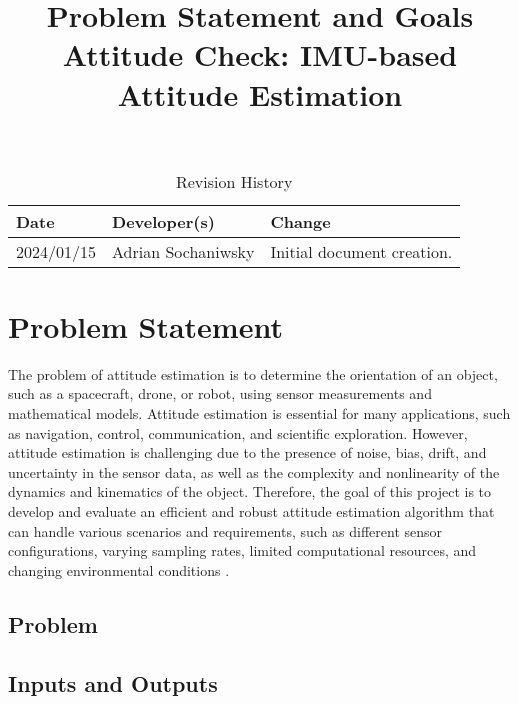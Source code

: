 \documentclass{article}
\title{Problem Statement and Goals \\ Attitude Check: IMU-based Attitude Estimation}
\author{\authname}
\date{}
\begin{document}
\maketitle

\begin{table}[hp]
\caption{Revision History} \label{TblRevisionHistory}
\begin{tabularx}{\textwidth}{llX}
\toprule
\textbf{Date} & \textbf{Developer(s)} & \textbf{Change}\\
\midrule
2024/01/15 & Adrian Sochaniwsky & Initial document creation.\\
\bottomrule
\end{tabularx}
\end{table}

\section{Problem Statement}


The problem of attitude estimation is to determine the orientation of an object, such as a spacecraft, drone, or robot, using sensor measurements and mathematical models. Attitude estimation is essential for many applications, such as navigation, control, communication, and scientific exploration. However, attitude estimation is challenging due to the presence of noise, bias, drift, and uncertainty in the sensor data, as well as the complexity and nonlinearity of the dynamics and kinematics of the object. Therefore, the goal of this project is to develop and evaluate an efficient and robust attitude estimation algorithm that can handle various scenarios and requirements, such as different sensor configurations, varying sampling rates, limited computational resources, and changing environmental conditions \cite{statement}.

\subsection{Problem}

\subsection{Inputs and Outputs}
\end{document}
